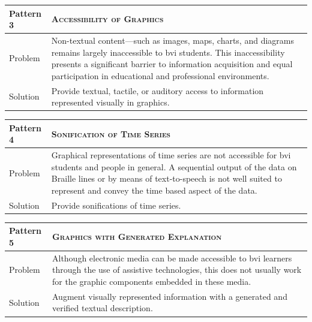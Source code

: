 \vspace{-3em}
\begin{table}[!ht]
    \centering
\begin{tabularx}{\textwidth}{|p{}|X|}
    \hline
         Pattern  3 & \textsc{Accessibility of Graphics}  \\ \hline
         Problem &  Non-textual content—such as images, maps, charts, and diagrams remains largely inaccessible to \ac{bvi} students. This inaccessibility presents a significant barrier to information acquisition and equal participation in educational and professional environments.  \\ \hline
         Solution &  Provide textual, tactile, or auditory access to information represented visually in graphics.  \\ \hline
\end{tabularx}
\end{table}
\vspace{-3em}
\begin{table}[!ht]
    \centering
\begin{tabularx}{\textwidth}{|p{}|X|}
    \hline
         Pattern 4 & \textsc{Sonification of Time Series}  \\ \hline
         Problem & Graphical representations of time series  are not accessible for \ac{bvi} students and people in general. A sequential output of the data on Braille lines or by means of text-to-speech is not well suited to represent and convey the time based aspect of the data.   \\ \hline
         Solution &  Provide sonifications of time series. \\ \hline
\end{tabularx}
\end{table}
\vspace{-3em}
\begin{table}[!ht]
    \centering
\begin{tabularx}{\textwidth}{|p{}|X|}
    \hline
         Pattern 5 & \textsc{Graphics with Generated Explanation}  \\ \hline
         Problem &  Although electronic media can be made accessible to \ac{bvi} learners through the use of assistive technologies, this does not usually work for the graphic components embedded in these media. \\ \hline
         Solution &  Augment visually represented information with a generated and verified textual description.  \\ \hline
\end{tabularx}
\end{table}

